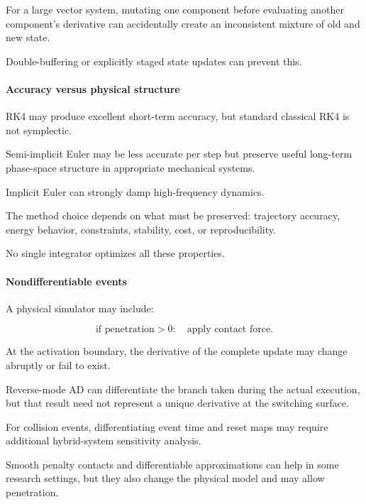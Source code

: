 For a large vector system, mutating one component before evaluating another component's derivative can accidentally create an inconsistent mixture of old and new state.

Double-buffering or explicitly staged state updates can prevent this.

\paragraph{Accuracy versus physical structure}\label{02-foundations-ii-ch022-accuracy-versus-physical-structure}

\hypertarget{02-foundations-ii-ch022-accuracy-versus-physical-structure}{}

RK4 may produce excellent short-term accuracy, but standard classical RK4 is not symplectic.

Semi-implicit Euler may be less accurate per step but preserve useful long-term phase-space structure in appropriate mechanical systems.

Implicit Euler can strongly damp high-frequency dynamics.

The method choice depends on what must be preserved: trajectory accuracy, energy behavior, constraints, stability, cost, or reproducibility.

No single integrator optimizes all these properties.

\paragraph{Nondifferentiable events}\label{02-foundations-ii-ch022-nondifferentiable-events}

\hypertarget{02-foundations-ii-ch022-nondifferentiable-events}{}

A physical simulator may include:

\[
\text{if penetration}>0: \quad\text{apply contact force}.
\]

At the activation boundary, the derivative of the complete update may change abruptly or fail to exist.

Reverse-mode AD can differentiate the branch taken during the actual execution, but that result need not represent a unique derivative at the switching surface.

For collision events, differentiating event time and reset maps may require additional hybrid-system sensitivity analysis.

Smooth penalty contacts and differentiable approximations can help in some research settings, but they also change the physical model and may allow penetration.

